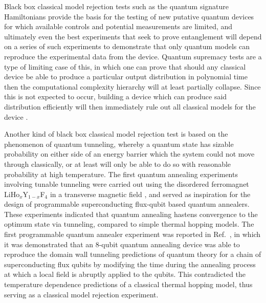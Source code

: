 Black box classical model rejection tests such as the quantum signature Hamiltonians provide the basis for the testing of new putative quantum devices for which available controls and potential measurements are limited, and ultimately even the best experiments that seek to prove entanglement will depend on a series of such experiments to demonstrate that only quantum models can reproduce the experimental data from the device. Quantum supremacy tests are a type of limiting case of this, in which one can prove that should any classical device be able to produce a particular output distribution in polynomial time then the computational complexity hierarchy will at least partially collapse. Since this is not expected to occur, building a device which can produce said distribution efficiently will then immediately rule out all classical models for the device \cite{Aaronson:2016aa}.

Another kind of black box classical model rejection test is based on the phenomenon of quantum tunneling, whereby a quantum state has sizable probability on either side of an energy barrier which the system could not move through classically, or at least will only be able to do so with reasonable probability at high temperature. The first quantum annealing experiments involving tunable
tunneling were carried out using the disordered ferromagnet LiHo$_x$Y$_{1-x}$F$_4$ in a transverse magnetic field \cite{Brooke1999,brooke_tunable_2001}, and served as inspiration for the design of programmable superconducting flux-qubit based quantum annealers. These experiments indicated that quantum annealing hastens convergence to the optimum state via tunneling, compared to simple thermal hopping models.
The first programmable quantum annealer experiment was reported in Ref.~\cite{DWave}, in which it was demonstrated that an $8$-qubit quantum annealing device was able to reproduce the domain wall tunneling predictions of quantum theory for a chain of superconducting flux qubits by modifying the time during the annealing process at which a local field is abruptly applied to the qubits. This contradicted the temperature dependence predictions of a classical thermal hopping model, thus serving as a classical model rejection experiment.

